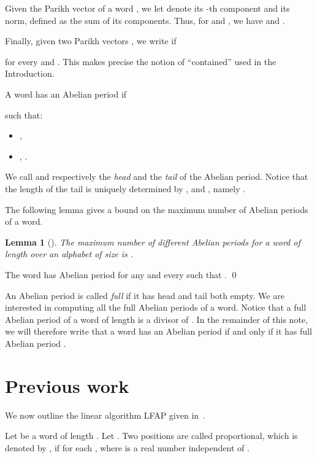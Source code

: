 \documentclass[3p]{elsarticle}
\newtheorem{lem}[thm]{Lemma}
\begin{document}
Given the Parikh vector  of a word , we let  denote its
 -th component and  its norm, defined as the sum of its components.
Thus, for  and , we have
  and .

Finally, given two Parikh vectors , we write  if
 
 for every  and . 
This makes precise the notion of ``contained'' used in the Introduction.
 
\begin{defi}
\label{def-ap}
A word  has an Abelian period  if
  
 such that:

\begin{itemize}
 \item ,
 \item , .
\end{itemize}

\end{defi}

We call  and  respectively the \emph{head} and the
 \emph{tail}  of the Abelian period.
 Notice that the length  of the tail is uniquely determined
 by ,  and , namely . 

The following lemma gives a bound on the maximum number of Abelian periods
 of a word.
\begin{lem}[\cite{PSC2011-16}]
\label{lemma-max}
The maximum number of different Abelian periods  for a word of length  over
 an alphabet of size 
 is .
\end{lem}

\begin{pf}
The word  has Abelian period
  for any  and every  such that 
 . \qed
\end{pf}

An Abelian period is called \emph{full} if it has head and tail both empty.
We are interested in computing all the full Abelian periods of a word. Notice that a full Abelian period of a word of length  is a divisor of .
In the remainder of this note, we will therefore write that a word 
 has an Abelian period  if and only if it has full Abelian period . 
 
\section{Previous work}\label{sec-prev-work}


We now outline the linear algorithm LFAP given in~\cite{KoRaRy13}.

Let  be a word of length .
Let .
Two positions  are called proportional,
 which is denoted by , if 
 for each , where  is a real number independent of .
 
\end{document}
